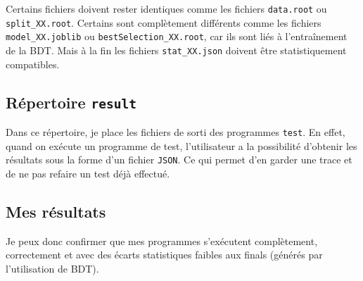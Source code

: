 Certains fichiers doivent rester identiques comme les fichiers \verb|data.root| ou \verb|split_XX.root|. Certains sont complètement différents comme les fichiers \verb|model_XX.joblib| ou \verb|bestSelection_XX.root|, car ils sont liés à l'entraînement de la BDT. Mais à la fin les fichiers \verb|stat_XX.json| doivent être statistiquement compatibles.

\subsection{Répertoire \texttt{result}}

Dans ce répertoire, je place les fichiers de sorti des programmes \texttt{test}. 
En effet, quand on exécute un programme de test, l'utilisateur a la possibilité d'obtenir les résultats sous la forme d'un fichier \texttt{JSON}. 
Ce qui permet d'en garder une trace et de ne pas refaire un test déjà effectué.\\

\subsection{Mes résultats}

Je peux donc confirmer que mes programmes s'exécutent complètement, correctement et avec des écarts statistiques faibles aux finals (générés par l'utilisation de BDT).